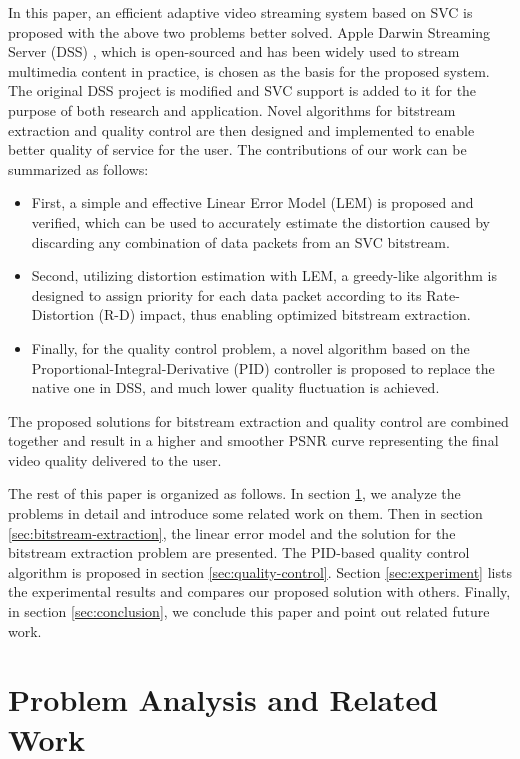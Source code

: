 \documentclass[journal,draftclsnofoot,onecolumn]{IEEEtran}
\begin{document}
In this paper, an efficient adaptive video streaming system based on SVC is proposed with the above two problems better solved. Apple Darwin Streaming Server (DSS) \cite{DSS}, which is open-sourced and has been widely used to stream multimedia content in practice, is chosen as the basis for the proposed system. The original DSS project is modified and SVC support is added to it for the purpose of both research and application. Novel algorithms for bitstream extraction and quality control are then designed and implemented to enable better quality of service for the user. The contributions of our work can be summarized as follows:
\begin{itemize}
\item First, a simple and effective Linear Error Model (LEM) is proposed and verified, which can be used to accurately estimate the distortion caused by discarding any combination of data packets from an SVC bitstream.
\item Second, utilizing distortion estimation with LEM, a greedy-like algorithm is designed to assign priority for each data packet according to its Rate-Distortion (R-D) impact, thus enabling optimized bitstream extraction.
\item Finally, for the quality control problem, a novel algorithm based on the Proportional-Integral-Derivative (PID) controller is proposed to replace the native one in DSS, and much lower quality fluctuation is achieved.
\end{itemize}

The proposed solutions for bitstream extraction and quality control are combined together and result in a higher and smoother PSNR curve representing the final video quality delivered to the user.

The rest of this paper is organized as follows. In section \ref{sec:analysis}, we analyze the problems in detail and introduce some related work on them. Then in section \ref{sec:bitstream-extraction}, the linear error model and the solution for the bitstream extraction problem are presented. The PID-based quality control algorithm is proposed in section \ref{sec:quality-control}. Section \ref{sec:experiment} lists the experimental results and compares our proposed solution with others. Finally, in section \ref{sec:conclusion}, we conclude this paper and point out related future work.


\section{Problem Analysis and Related Work}
\label{sec:analysis}
\end{document}
